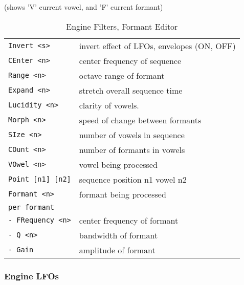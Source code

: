    \begin{table}[H]
      \centering
      \caption{Engine Filters, Formant Editor}
      (shows 'V' current vowel, and 'F' current formant)
      \label{table:yoshimi_engine_filters_formant_editor}
      \begin{tabular}{l l}

\texttt{Invert <s>} &
   invert effect of LFOs, envelopes (ON, OFF) \\
\texttt{CEnter <n>} &
   center frequency of sequence \\
\texttt{Range <n>} &
   octave range of formant \\
\texttt{Expand <n>} &
   stretch overall sequence time \\
\texttt{Lucidity <n>} &
   clarity of vowels. \\
\texttt{Morph <n>} &
   speed of change between formants \\
\texttt{SIze <n>} &
   number of vowels in sequence \\
\texttt{COunt <n>} &
   number of formants in vowels \\
\texttt{VOwel <n>} &
   vowel being processed \\
\texttt{Point [n1] [n2]} &
   sequence position n1 vowel n2 \\
\texttt{Formant <n>} &
   formant being processed \\
\texttt{per formant} &
    \\
\texttt{-  FRequency <n>} &
   center frequency of formant \\
\texttt{-  Q <n>} &
   bandwidth of formant \\
\texttt{-  Gain} &
   amplitude of formant \\
      \end{tabular}
   \end{table}

\subsubsection{Engine LFOs}
\label{subsec:command_line_engine_lfos}

